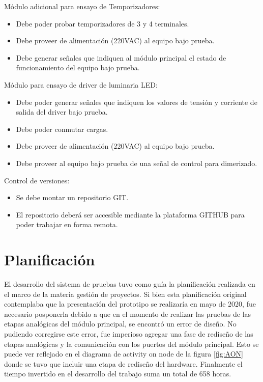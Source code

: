 Módulo adicional para ensayo de Temporizadores:

\begin{itemize}
	\item Debe poder probar temporizadores de 3 y 4 terminales.
	\item Debe proveer de alimentación (220VAC) al equipo bajo prueba.
	\item Debe generar señales que indiquen al módulo principal el estado de funcionamiento del equipo bajo prueba. 
	
\end{itemize}

Módulo para ensayo de driver de luminaria LED:

\begin{itemize}
	\item Debe poder generar señales que indiquen los valores de tensión y corriente de salida del driver bajo prueba.
	\item Debe poder conmutar cargas.
	\item Debe proveer de alimentación (220VAC) al equipo bajo prueba.
	\item Debe proveer al equipo bajo prueba de una señal de control para dimerizado.
\end{itemize}

Control de versiones:

\begin{itemize}
	\item Se debe montar un repositorio GIT.
	\item El repositorio deberá ser accesible mediante la plataforma GITHUB para poder trabajar en forma remota.
\end{itemize}

\section{Planificación}
El desarrollo del sistema de pruebas tuvo como guía la planificación realizada en el marco de la materia gestión de proyectos. Si bien esta planificación original contemplaba que la presentación del prototipo se realizaría en mayo de 2020, fue necesario posponerla debido a que en el momento de realizar las pruebas de las etapas analógicas del módulo principal, se encontró un error de diseño. No pudiendo corregirse este error, fue imperioso agregar una fase de rediseño de las etapas analógicas y la comunicación con los puertos del módulo principal. Esto se puede ver reflejado en el diagrama de activity on node de la figura \ref{fig:AON} donde se tuvo que incluir una etapa de rediseño del hardware. 
Finalmente el tiempo invertido en el desarrollo del trabajo suma un total de 658 horas.


